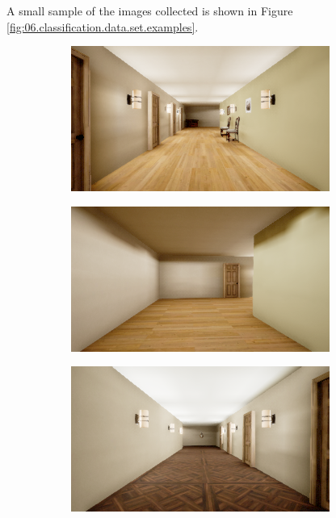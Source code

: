 A small sample of the images collected is shown in Figure \ref{fig:06.classification.data.set.examples}.

\begin{figure}[H]
    \centering
    \begin{subfigure}{0.32\textwidth}
        \centering
        \includegraphics[width=\textwidth]{resources/png/06/classification/datasets/0.png}
        \vspace{0.5em}
    \end{subfigure}
    \hfill
    \begin{subfigure}{0.32\textwidth}
        \centering
        \includegraphics[width=\textwidth]{resources/png/06/classification/datasets/1.png}
        \vspace{0.5em}
    \end{subfigure}
    \hfill
    \begin{subfigure}{0.32\textwidth}
        \centering
        \includegraphics[width=\textwidth]{resources/png/06/classification/datasets/2.png}

\end{subfigure}
\end{figure}
